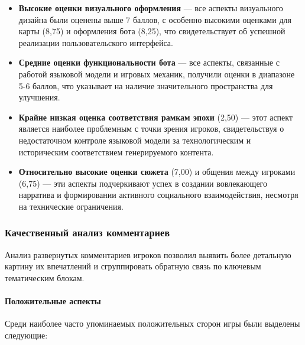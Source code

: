 \begin{itemize}
    \item \textbf{Высокие оценки визуального оформления} — все аспекты визуального дизайна были оценены выше 7 баллов, с особенно высокими оценками для карты (8,75) и оформления бота (8,25), что свидетельствует об успешной реализации пользовательского интерфейса.

    \item \textbf{Средние оценки функциональности бота} — все аспекты, связанные с работой языковой модели и игровых механик, получили оценки в диапазоне 5-6 баллов, что указывает на наличие значительного пространства для улучшения.

    \item \textbf{Крайне низкая оценка соответствия рамкам эпохи} (2,50) — этот аспект является наиболее проблемным с точки зрения игроков, свидетельствуя о недостаточном контроле языковой модели за технологическим и историческим соответствием генерируемого контента.

    \item \textbf{Относительно высокие оценки сюжета} (7,00) и общения между игроками (6,75) — эти аспекты подчеркивают успех в создании вовлекающего нарратива и формировании активного социального взаимодействия, несмотря на технические ограничения.
\end{itemize}

\subsubsection{Качественный анализ комментариев}

Анализ развернутых комментариев игроков позволил выявить более детальную картину их впечатлений и сгруппировать обратную связь по ключевым тематическим блокам.

\paragraph{Положительные аспекты}

Среди наиболее часто упоминаемых положительных сторон игры были выделены следующие:

